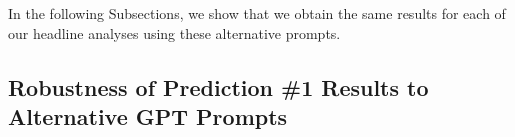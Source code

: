 In the following Subsections, we show that we obtain the same results for each of our headline analyses using these alternative prompts.




\subsection{Robustness of Prediction \#1 Results to Alternative GPT Prompts}
\label{app:gptPrompts_robustness_pred1}


